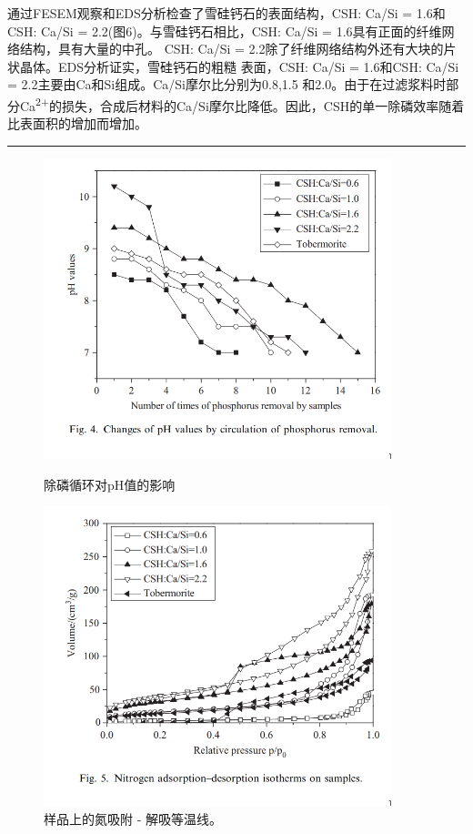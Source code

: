 \documentclass[11pt]{article}
\begin{document}
\setlength{\parindent}{1.0cm}
通过FESEM观察和EDS分析检查了雪硅钙石的表面结构，CSH: Ca/Si = 1.6和CSH: Ca/Si =
2.2(图6)。与雪硅钙石相比，CSH: Ca/Si = 1.6具有正面的纤维网络结构，具有大量的中孔。
CSH: Ca/Si = 2.2除了纤维网络结构外还有大块的片状晶体。EDS分析证实，雪硅钙石的粗糙
表面，CSH: Ca/Si = 1.6和CSH: Ca/Si = 2.2主要由Ca和Si组成。Ca/Si摩尔比分别为0.8,1.5
和2.0。由于在过滤浆料时部分Ca\textsuperscript{2+}的损失，合成后材料的Ca/Si摩尔比降低。因此，CSH的单一除磷效率随着比表面积的增加而增加。
\par

\noindent\rule{\textwidth}{0.5pt}

\begin{figure}
    \centering
    \begin{minipage}{0.45\textwidth}
        \centering
        \includegraphics[width=0.9\textwidth]{fig.4.png} %
        \caption{除磷循环对pH值的影响}
    \end{minipage}\hfill
    \begin{minipage}{0.45\textwidth}
        \centering
        \includegraphics[width=0.9\textwidth]{fig.5.png} %
        \caption{样品上的氮吸附 - 解吸等温线。}
    \end{minipage}
\end{figure}
\end{document}
